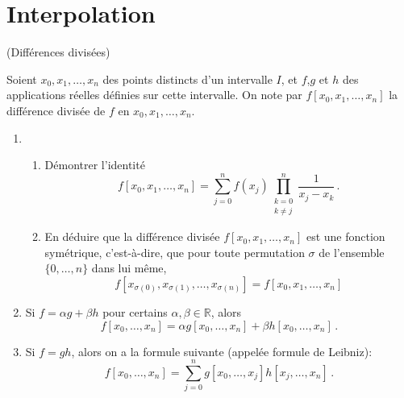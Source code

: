 \documentclass[a4paper,12pt,reqno]{amsart}
\begin{document}

\section{Interpolation}


\begin{exo} (Différences divisées)

Soient $x_0,x_1,\ldots,x_n$ des points distincts d'un intervalle $I$, et $f$,$g$ et $h$ des applications réelles définies sur cette intervalle. On note par $f[x_{0},x_{1},\ldots,x_{n}]$ la différence divisée de $f$ en $x_0,x_1,\ldots,x_n$.
  \begin{enumerate}
    \item
      \begin{enumerate}
        \item Démontrer l'identité
          $$
            f[x_{0},x_{1},\ldots,x_{n}] =
              \sum_{j=0}^{n} f(x_{j}) \prod_{\substack{k=0 \\ k\neq j}}^{n}
                \frac{1}{x_{j} - x_{k}}\,.
          $$

        \item En déduire que la différence divisée $f[x_{0},x_{1},\ldots,x_{n}]$ est une fonction symétrique, c'est-à-dire, que pour toute permutation $\sigma$ de l'ensemble $\{0,\ldots,n\}$ dans lui même,
          $$
            f[x_{\sigma(0)},x_{\sigma(1)},\ldots,x_{\sigma(n)}] = f[x_{0},x_{1},\ldots,x_{n}]
          $$
      \end{enumerate}

    \item Si $f = \alpha g + \beta h$ pour certains $\alpha ,\beta \in \mathbb{R}$, alors
      $$
        f[x_{0},\ldots,x_{n}] = \alpha g[x_{0},\ldots,x_{n}] + \beta h[x_{0},\ldots,x_{n}]\,.
      $$

    \item Si $f = gh$, alors on a la formule suivante (appelée formule de Leibniz):
      $$
        f[x_{0},\ldots,x_{n}] = \sum_{j=0}^{n} g[x_{0},\ldots,x_{j}]h[x_{j},\ldots,x_{n}]\,.
      $$
  \end{enumerate}
\end{exo}
\end{document}
